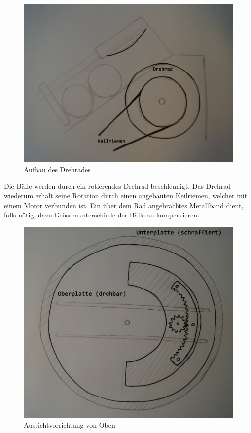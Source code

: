 \begin{figure}[h!]
	\centering
	\includegraphics[scale=0.35]{../../fig/Drehrad.jpg}
	\caption{Aufbau des Drehrades}
\end{figure}
Die Bälle werden durch ein rotierendes Drehrad beschleunigt. Das Drehrad wiederum erhält seine Rotation durch einen angebauten Keilriemen, welcher mit einem Motor verbunden ist. Ein über dem Rad angebrachtes Metallband dient, falls nötig, dazu Grössenunterschiede der Bälle zu kompensieren.
\begin{figure}[h!]
	\centering
	\includegraphics[scale=0.35]{../../fig/Ausrichtvorrichtung_Oben.jpg}
	\caption{Ausrichtvorrichtung von Oben}
\end{figure}
